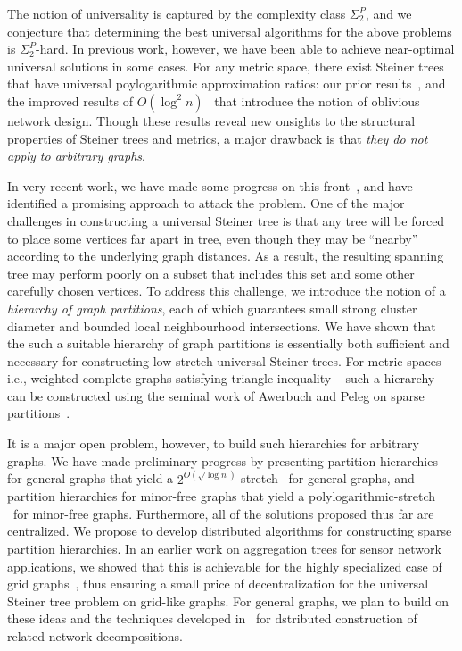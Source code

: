 
The notion of universality is captured by the complexity class
$\Sigma_2^P$, and we conjecture that determining the best universal
algorithms for the above problems is $\Sigma^P_2$-hard.  In previous
work, however, we have been able to achieve near-optimal universal
solutions in some cases.  For any metric space, there exist Steiner
trees that have universal poylogarithmic approximation ratios: our
prior results~\cite{jia+lnrs:universal}, and the improved results of
$O(\log^2 n)$~\cite{gupta+hr:oblivious} that introduce the notion of
oblivious network design.  Though these results reveal new onsights to
the structural properties of Steiner trees and metrics, a major
drawback is that {\em they do not apply to arbitrary graphs}.

In very recent work, we have made some progress on this
front~\cite{busch+drrs:ust}, and have identified a promising approach
to attack the problem.  One of the major challenges in constructing a
universal Steiner tree is that any tree will be forced to place some
vertices far apart in tree, even though they may be ``nearby''
according to the underlying graph distances.  As a result, the
resulting spanning tree may perform poorly on a subset that includes
this set and some other carefully chosen vertices.  To address this
challenge, we introduce the notion of a {\em hierarchy of graph
  partitions}, each of which guarantees small strong cluster diameter
and bounded local neighbourhood intersections.  We have shown that the
such a suitable hierarchy of graph partitions is essentially both
sufficient and necessary for constructing low-stretch universal
Steiner trees.  For metric spaces -- i.e., weighted complete graphs
satisfying triangle inequality -- such a hierarchy can be constructed
using the seminal work of Awerbuch and Peleg on sparse
partitions~\cite{awerbuch+p:partition,peleg:distributeBook}.

It is a major open problem, however, to build such hierarchies for
arbitrary graphs.  We have made preliminary progress by presenting
partition hierarchies for general graphs that yield a $2^{O(\sqrt{\log
    n})}$-stretch \ust\ for general graphs, and partition hierarchies
for minor-free graphs that yield a polylogarithmic-stretch \ust\ for
minor-free graphs.  Furthermore, all of the solutions proposed thus
far are centralized.  We propose to develop distributed algorithms for
constructing sparse partition hierarchies.  In an earlier work on
aggregation trees for sensor network applications, we showed that this
is achievable for the highly specialized case of grid
graphs~\cite{jia+nrs:gist}, thus ensuring a small price of
decentralization for the universal Steiner tree problem on grid-like
graphs.  For general graphs, we plan to build on these ideas and the
techniques developed in~\cite{peleg:distributeBook} for dstributed construction
of related network decompositions.

